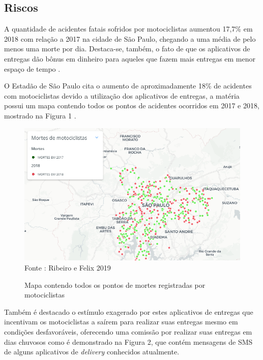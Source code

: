 \subsection{\textbf{Riscos}}

A quantidade de acidentes fatais sofridos por motociclistas aumentou 17,7\% em 2018 com relação a 2017 na cidade de São Paulo, chegando a uma média de pelo menos uma morte por dia. Destaca-se, também, o fato de que os aplicativos de entregas dão bônus em dinheiro para aqueles que fazem mais entregas em menor espaço de tempo \cite{2019acidentes}.

O Estadão de São Paulo  cita o aumento de aproximadamente 18\% de acidentes com motociclistas devido a utilização dos aplicativos de entregas, a matéria possui um mapa contendo todos os pontos de acidentes ocorridos em 2017 e 2018, mostrado na Figura 1 \cite{ribeiro2019mortes}.



 \begin{figure}[H]

 \caption{Mapa contendo todos os pontos de mortes registradas por motociclistas}
  \includegraphics[width=\textwidth]{images/Cap2/mapa.png}
   \scriptsize  Fonte : Ribeiro e Felix 2019
   
  \end{figure}

Também é destacado o estímulo exagerado por estes aplicativos de entregas que incentivam os motociclistas a saírem para realizar suas entregas mesmo em condições desfavoráveis, oferecendo uma comissão por realizar suas entregas  em dias chuvosos como é demonstrado na Figura 2, que contém mensagens de SMS de alguns aplicativos de \textit{delivery} conhecidos atualmente.



